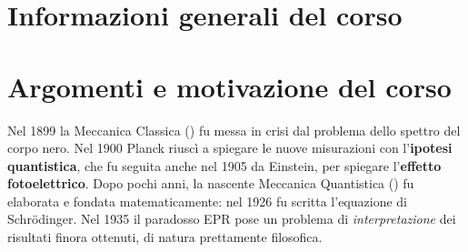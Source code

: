 \documentclass[../../InformazioneQuantistica.tex]{subfiles}
\begin{document}
\section{Informazioni generali del corso}

\section{Argomenti e motivazione del corso}
Nel 1899 la Meccanica Classica (\MC) fu messa in crisi dal problema dello spettro del corpo nero. Nel 1900 Planck riuscì a spiegare le nuove misurazioni con l'\textbf{ipotesi quantistica}, che fu seguita anche nel 1905 da Einstein, per spiegare l'\textbf{effetto fotoelettrico}. Dopo pochi anni, la nascente Meccanica Quantistica (\MQ) fu elaborata e fondata matematicamente: nel 1926 fu scritta l'equazione di Schr\"odinger. Nel 1935 il paradosso EPR pose un problema di \textit{interpretazione} dei risultati finora ottenuti, di natura prettamente filosofica. \\
\end{document}

